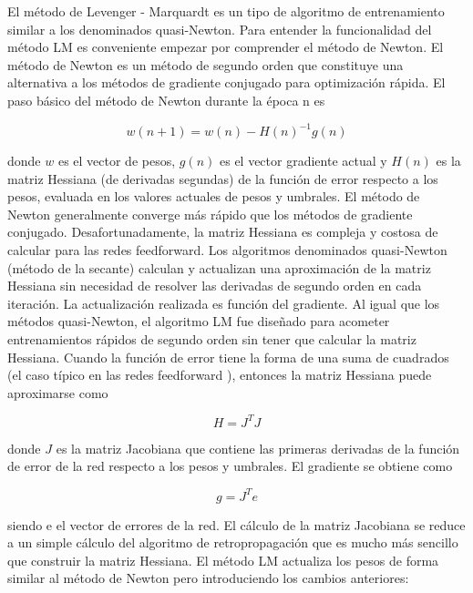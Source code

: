 \documentclass[12pt]{article}
\newcounter{subsubsubsection}[subsubsection]
\newcounter{subsubsubsubsection}[subsubsubsection]
\begin{document}

El método de Levenger - Marquardt es un tipo de algoritmo de entrenamiento similar a los denominados quasi-Newton. Para entender la funcionalidad del método LM es conveniente empezar por comprender el método de Newton. El método
de Newton es un método de segundo orden que constituye una alternativa a los métodos de gradiente conjugado para optimización rápida. El paso básico del método de Newton
durante la época n es

\begin{equation}
w(n+1) = w(n) - H(n)^{-1}g(n)
\end{equation}

donde $w$ es el vector de pesos, $g(n)$ es el vector gradiente actual y $H(n)$ es la matriz Hessiana (de derivadas segundas) de la función de error respecto a los pesos, evaluada en los valores actuales de pesos y umbrales. El método de Newton generalmente converge más rápido que los métodos de gradiente conjugado. Desafortunadamente, la matriz Hessiana es compleja y costosa de calcular para las redes feedforward. Los algoritmos
denominados quasi-Newton (método de la secante) calculan y actualizan una aproximación de la matriz Hessiana sin necesidad de resolver las derivadas de segundo orden en cada iteración. La actualización realizada es función del gradiente.
Al igual que los métodos quasi-Newton, el algoritmo LM fue diseñado para acometer entrenamientos rápidos de segundo orden sin tener que calcular la matriz Hessiana.
Cuando la función de error tiene la forma de una suma de cuadrados (el caso típico en las redes feedforward ), entonces la matriz Hessiana puede aproximarse como

\begin{equation}
H = J^TJ
\end{equation}

donde $J$ es la matriz Jacobiana que contiene las primeras derivadas de la función de error de la red respecto a los pesos y umbrales. El gradiente se obtiene como

\begin{equation}
g=J^Te
\end{equation}

siendo e el vector de errores de la red. El cálculo de la matriz Jacobiana se reduce a un simple cálculo del algoritmo de retropropagación que es mucho más sencillo que
construir la matriz Hessiana. El método LM actualiza los pesos de forma similar al método de Newton pero introduciendo los cambios anteriores:
\end{document}
